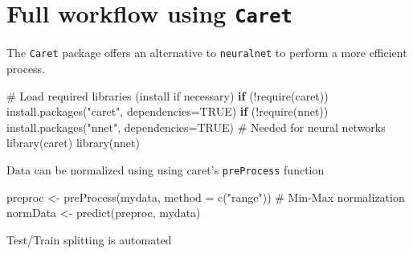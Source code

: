 \documentclass[
  letterpaper,
  DIV=11,
  numbers=noendperiod,
  oneside]{scrartcl}
\newenvironment{Shaded}{\begin{snugshade}}{\end{snugshade}}
\newcommand{\AttributeTok}[1]{\textcolor[rgb]{0.40,0.45,0.13}{#1}}
\newcommand{\CommentTok}[1]{\textcolor[rgb]{0.37,0.37,0.37}{#1}}
\newcommand{\ConstantTok}[1]{\textcolor[rgb]{0.56,0.35,0.01}{#1}}
\newcommand{\ControlFlowTok}[1]{\textcolor[rgb]{0.00,0.23,0.31}{\textbf{#1}}}
\newcommand{\DecValTok}[1]{\textcolor[rgb]{0.68,0.00,0.00}{#1}}
\newcommand{\FloatTok}[1]{\textcolor[rgb]{0.68,0.00,0.00}{#1}}
\newcommand{\FunctionTok}[1]{\textcolor[rgb]{0.28,0.35,0.67}{#1}}
\newcommand{\NormalTok}[1]{\textcolor[rgb]{0.00,0.23,0.31}{#1}}
\newcommand{\OtherTok}[1]{\textcolor[rgb]{0.00,0.23,0.31}{#1}}
\newcommand{\SpecialCharTok}[1]{\textcolor[rgb]{0.37,0.37,0.37}{#1}}
\newcommand{\StringTok}[1]{\textcolor[rgb]{0.13,0.47,0.30}{#1}}
\begin{document}
\section{\texorpdfstring{Full workflow using
\texttt{Caret}}{Full workflow using Caret}}\label{full-workflow-using-caret}

The \texttt{Caret} package offers an alternative to \texttt{neuralnet}
to perform a more efficient process.

\begin{Shaded}
\begin{Highlighting}[]
\CommentTok{\# Load required libraries (install if necessary)}
\ControlFlowTok{if}\NormalTok{ (}\SpecialCharTok{!}\FunctionTok{require}\NormalTok{(caret)) }\FunctionTok{install.packages}\NormalTok{(}\StringTok{"caret"}\NormalTok{, }\AttributeTok{dependencies=}\ConstantTok{TRUE}\NormalTok{)}
\ControlFlowTok{if}\NormalTok{ (}\SpecialCharTok{!}\FunctionTok{require}\NormalTok{(nnet)) }\FunctionTok{install.packages}\NormalTok{(}\StringTok{"nnet"}\NormalTok{, }\AttributeTok{dependencies=}\ConstantTok{TRUE}\NormalTok{)  }\CommentTok{\# Needed for neural networks}
\FunctionTok{library}\NormalTok{(caret)}
\FunctionTok{library}\NormalTok{(nnet)}
\end{Highlighting}
\end{Shaded}

Data can be normalized using using caret's \texttt{preProcess} function

\begin{Shaded}
\begin{Highlighting}[]
\NormalTok{preproc }\OtherTok{\textless{}{-}} \FunctionTok{preProcess}\NormalTok{(mydata, }\AttributeTok{method =} \FunctionTok{c}\NormalTok{(}\StringTok{"range"}\NormalTok{))  }\CommentTok{\# Min{-}Max normalization}
\NormalTok{normData }\OtherTok{\textless{}{-}} \FunctionTok{predict}\NormalTok{(preproc, mydata)}
\end{Highlighting}
\end{Shaded}

Test/Train splitting is automated

\begin{Shaded}
\end{Shaded}
\end{document}
